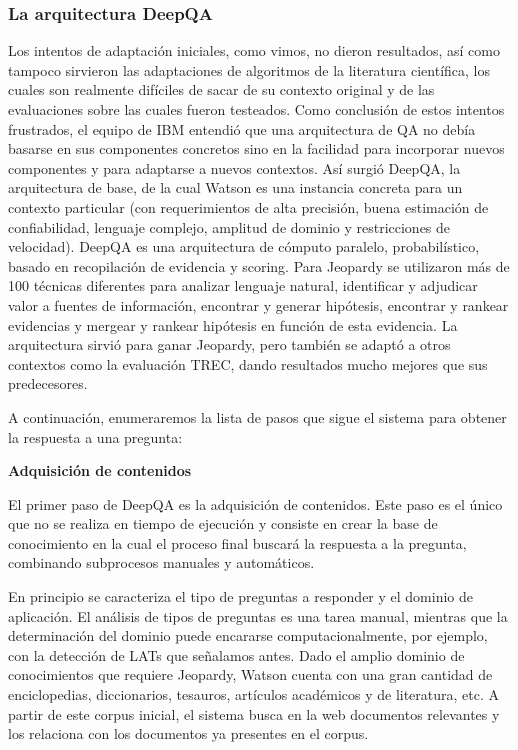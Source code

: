 \subsubsection*{La arquitectura DeepQA}
\label{subsec:deep-qa}
Los intentos de adaptación iniciales, como vimos, no dieron resultados, así como tampoco sirvieron las adaptaciones de algoritmos de la literatura científica, los cuales son realmente difíciles de
sacar de su contexto original y de las evaluaciones sobre las cuales fueron testeados. Como conclusión de estos intentos frustrados, el equipo de IBM entendió que una arquitectura de QA no debía basarse en sus componentes concretos sino en la facilidad para incorporar nuevos componentes y para adaptarse a nuevos contextos. Así surgió DeepQA, la arquitectura de base, de la cual Watson es una instancia concreta para un contexto particular (con requerimientos de alta precisión, buena estimación de confiabilidad, lenguaje complejo, amplitud de dominio y restricciones de velocidad). DeepQA es una arquitectura de cómputo paralelo, probabilístico, basado en recopilación de evidencia y scoring. Para Jeopardy se utilizaron más de 100 técnicas diferentes para analizar lenguaje natural, identificar y adjudicar valor a fuentes de información, encontrar y generar hipótesis, encontrar y rankear evidencias y mergear y rankear hipótesis en función de esta evidencia. La arquitectura sirvió para ganar Jeopardy, pero también se adaptó a otros contextos como la evaluación TREC, dando resultados mucho mejores que sus predecesores.
\medskip

A continuación, enumeraremos la lista de pasos que sigue el sistema para obtener la respuesta a una pregunta: \newline

\textbf{Adquisición de contenidos} \newline

El primer paso de DeepQA es la adquisición de contenidos. Este paso es
el único que no se realiza en tiempo de ejecución y consiste en
crear la base de conocimiento en la cual el proceso final buscará la
respuesta a la pregunta, combinando subprocesos manuales y
automáticos.

En principio se caracteriza el tipo de preguntas a responder y el
dominio de aplicación. El análisis de tipos de preguntas es una
tarea manual, mientras que la determinación del dominio puede
encararse computacionalmente, por ejemplo, con la detección de LATs
que señalamos antes. Dado el amplio dominio de conocimientos que
requiere Jeopardy, Watson cuenta con una gran cantidad de
enciclopedias, diccionarios, tesauros, artículos académicos y de
literatura, etc. A partir de este corpus inicial, el sistema busca en
la web documentos relevantes y los relaciona con los documentos ya
presentes en el corpus.

